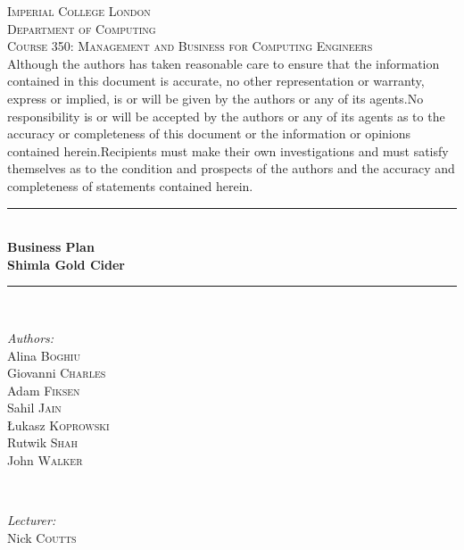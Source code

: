 \documentclass[11pt]{article}
\begin{document}

\begin{titlepage}
\newcommand{\HRule}{\rule{\linewidth}{0.5mm}}
\center
\textsc{\LARGE Imperial College London}  \\[1.5cm]
\textsc{\Large Department of Computing}  \\[0.5cm]
\textsc{\large Course 350: Management and Business for Computing Engineers} \\[0.5cm]

\noindent Although the authors has taken reasonable care to ensure that the information contained in this
document is accurate, no other representation or warranty, express or implied, is or will be
given by the authors or any of its agents.No responsibility is or will be accepted by the authors or any of its
agents as to the accuracy or completeness of this document or the information or opinions
contained herein.Recipients must make their own investigations and must satisfy themselves
as to the condition and prospects of the authors and the accuracy and completeness of statements
contained herein. \\

\HRule \\[0.3cm]
{\huge \bfseries Business Plan \\ \vspace{0.3cm}Shimla Gold Cider} \\[0.3cm]
\HRule \\[1.5cm]
\begin{minipage}{0.4\textwidth}

\begin{flushleft} \large \emph{Authors:} \\
Alina     \textsc{Boghiu}    \\
Giovanni  \textsc{Charles}   \\
Adam      \textsc{Fiksen}    \\
Sahil     \textsc{Jain}      \\
\L ukasz  \textsc{Koprowski} \\
Rutwik    \textsc{Shah}      \\
John      \textsc{Walker}    \\
\end{flushleft}

\end{minipage}~
\begin{minipage}{0.4\textwidth}

\begin{flushright} \large \emph{Lecturer:} \\
Nick \textsc{Coutts}
\end{flushright}
\end{minipage}\\[4cm]

\end{titlepage}
\end{document}
